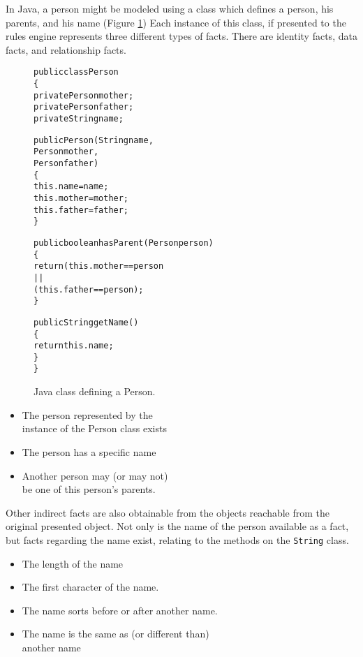 \documentclass[10pt,twocolumn,letterpaper,colorhighlight]{article}
\newenvironment{codelisting}%
	{\begin{minipage}{250pt}\small\begin{alltt}}%
	{\end{alltt}\end{minipage}}
\begin{document}
In Java, a person might be modeled using a class which defines a
person, his parents, and his name (Figure \ref{Person.class})
Each instance of this class, if presented to the rules engine
represents three different types of facts.  There are identity facts,
data facts, and relationship facts.


	\begin{figure}
	\begin{codelisting}
	public class Person
	\{
	    private Person mother;
	    private Person father;
	    private String name;

	    public Person(String name,
	                  Person mother,
	                  Person father)
	    \{
	         this.name   = name;
	         this.mother = mother;
	         this.father = father;
	    \}

    	public boolean hasParent(Person person)
    	\{
	         return ( this.mother == person
	                  ||
	                ( this.father == person );
    	\}
	
    	public String getName()
    	\{
	         return this.name;
    	\}
	\}
	\end{codelisting}
	\caption{Java class defining a Person.}
	\label{Person.class}
	\end{figure}

	\begin{itemize}
		\item The person represented by the\\instance of the Person class exists
		\item The person has a specific name
		\item Another person may (or may not)\\ be one of this person's parents.
	\end{itemize}

Other indirect facts are also obtainable from the objects reachable
from the original presented object. Not only is the name of the person
available as a fact, but facts regarding the name exist, relating to
the methods on the \verb|String| class.

	\begin{itemize}
		\item The length of the name
		\item The first character of the name.    
		\item The name sorts before or after another name.
		\item The name is the same as (or different than)\\another name
	\end{itemize}
\end{document}
